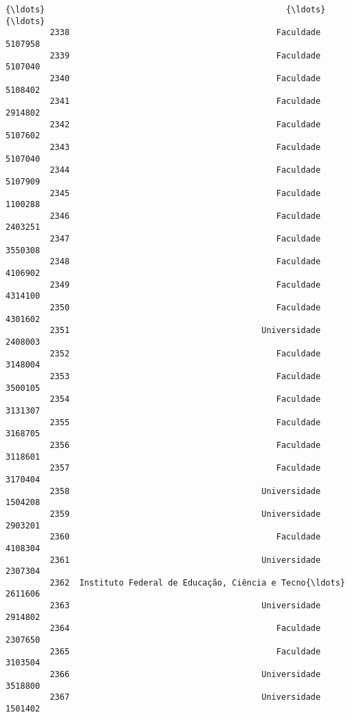 \documentclass[11pt]{article}
\begin{document}
\begin{Verbatim}[commandchars=\\\{\}]
         {\ldots}                                                 {\ldots}               {\ldots}   
         2338                                          Faculdade           5107958   
         2339                                          Faculdade           5107040   
         2340                                          Faculdade           5108402   
         2341                                          Faculdade           2914802   
         2342                                          Faculdade           5107602   
         2343                                          Faculdade           5107040   
         2344                                          Faculdade           5107909   
         2345                                          Faculdade           1100288   
         2346                                          Faculdade           2403251   
         2347                                          Faculdade           3550308   
         2348                                          Faculdade           4106902   
         2349                                          Faculdade           4314100   
         2350                                          Faculdade           4301602   
         2351                                       Universidade           2408003   
         2352                                          Faculdade           3148004   
         2353                                          Faculdade           3500105   
         2354                                          Faculdade           3131307   
         2355                                          Faculdade           3168705   
         2356                                          Faculdade           3118601   
         2357                                          Faculdade           3170404   
         2358                                       Universidade           1504208   
         2359                                       Universidade           2903201   
         2360                                          Faculdade           4108304   
         2361                                       Universidade           2307304   
         2362  Instituto Federal de Educação, Ciência e Tecno{\ldots}           2611606   
         2363                                       Universidade           2914802   
         2364                                          Faculdade           2307650   
         2365                                          Faculdade           3103504   
         2366                                       Universidade           3518800   
         2367                                       Universidade           1501402   
         

\end{Verbatim}
\end{document}
